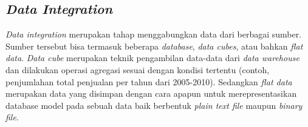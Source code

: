 



\subsection{\textsl{Data Integration}}
\textsl{Data integration} merupakan tahap menggabungkan data dari berbagai sumber. Sumber tersebut bisa termasuk beberapa \textsl{database}, \textsl{data cubes}, atau bahkan \textsl{flat data}. \textsl{Data cube} merupakan teknik pengambilan data-data dari \textsl{data warehouse} dan dilakukan operasi agregasi sesuai dengan kondisi tertentu (contoh, penjumlahan total penjualan per tahun dari 2005-2010). Sedangkan \textsl{flat data} merupakan data yang disimpan dengan cara apapun untuk merepresentasikan database model pada sebuah data baik berbentuk \textsl{plain text file} maupun \textsl{binary file}. 

